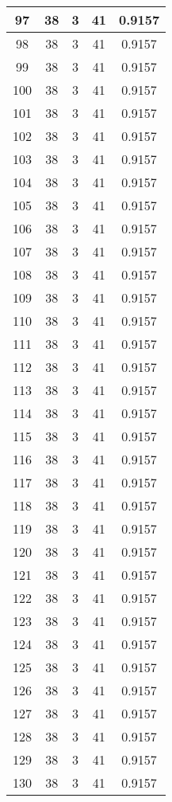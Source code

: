 \documentclass[letterpaper, 12pt]{article}
\begin{document}
\begin{longtable}{|c|c|c|c|c|}
\hline
97 & 38 & 3 & 41 & 0.9157 \\
\hline
98 & 38 & 3 & 41 & 0.9157 \\
\hline
99 & 38 & 3 & 41 & 0.9157 \\
\hline
100 & 38 & 3 & 41 & 0.9157 \\
\hline
101 & 38 & 3 & 41 & 0.9157 \\
\hline
102 & 38 & 3 & 41 & 0.9157 \\
\hline
103 & 38 & 3 & 41 & 0.9157 \\
\hline
104 & 38 & 3 & 41 & 0.9157 \\
\hline
105 & 38 & 3 & 41 & 0.9157 \\
\hline
106 & 38 & 3 & 41 & 0.9157 \\
\hline
107 & 38 & 3 & 41 & 0.9157 \\
\hline
108 & 38 & 3 & 41 & 0.9157 \\
\hline
109 & 38 & 3 & 41 & 0.9157 \\
\hline
110 & 38 & 3 & 41 & 0.9157 \\
\hline
111 & 38 & 3 & 41 & 0.9157 \\
\hline
112 & 38 & 3 & 41 & 0.9157 \\
\hline
113 & 38 & 3 & 41 & 0.9157 \\
\hline
114 & 38 & 3 & 41 & 0.9157 \\
\hline
115 & 38 & 3 & 41 & 0.9157 \\
\hline
116 & 38 & 3 & 41 & 0.9157 \\
\hline
117 & 38 & 3 & 41 & 0.9157 \\
\hline
118 & 38 & 3 & 41 & 0.9157 \\
\hline
119 & 38 & 3 & 41 & 0.9157 \\
\hline
120 & 38 & 3 & 41 & 0.9157 \\
\hline
121 & 38 & 3 & 41 & 0.9157 \\
\hline
122 & 38 & 3 & 41 & 0.9157 \\
\hline
123 & 38 & 3 & 41 & 0.9157 \\
\hline
124 & 38 & 3 & 41 & 0.9157 \\
\hline
125 & 38 & 3 & 41 & 0.9157 \\
\hline
126 & 38 & 3 & 41 & 0.9157 \\
\hline
127 & 38 & 3 & 41 & 0.9157 \\
\hline
128 & 38 & 3 & 41 & 0.9157 \\
\hline
129 & 38 & 3 & 41 & 0.9157 \\
\hline
130 & 38 & 3 & 41 & 0.9157 \\

\end{longtable}
\end{document}
